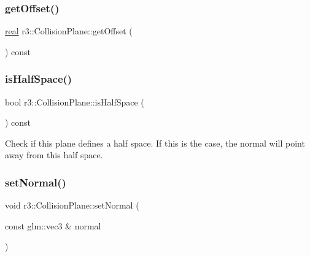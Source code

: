 \mbox{\label{classr3_1_1_collision_plane_a62e2b4bd6a811f8d2541329cd9a49bf8}} 
\subsubsection{\texorpdfstring{get\+Offset()}{getOffset()}}
{\footnotesize\ttfamily \mbox{\hyperlink{namespacer3_ab2016b3e3f743fb735afce242f0dc1eb}{real}} r3\+::\+Collision\+Plane\+::get\+Offset (\begin{DoxyParamCaption}{ }\end{DoxyParamCaption}) const}

\mbox{\label{classr3_1_1_collision_plane_a87f5071d181b4c643b42cb2448464be2}} 
\subsubsection{\texorpdfstring{is\+Half\+Space()}{isHalfSpace()}}
{\footnotesize\ttfamily bool r3\+::\+Collision\+Plane\+::is\+Half\+Space (\begin{DoxyParamCaption}{ }\end{DoxyParamCaption}) const}

Check if this plane defines a half space. If this is the case, the normal will point away from this half space. \mbox{\label{classr3_1_1_collision_plane_a1fa140b6648f14bef9720ac0d4eefc99}} 
\subsubsection{\texorpdfstring{set\+Normal()}{setNormal()}}
{\footnotesize\ttfamily void r3\+::\+Collision\+Plane\+::set\+Normal (\begin{DoxyParamCaption}\item[{const glm\+::vec3 \&}]{normal }\end{DoxyParamCaption})}

